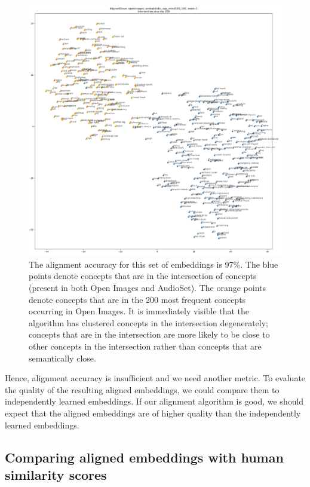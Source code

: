 \begin{figure}[H]
\label{fig:dysfunctional_clusters}
    \centering
    \includegraphics[width=1.0\textwidth]{images/method/probabilistic_aligned/dysfunctional_clusters.png}
    \caption{
        The alignment accuracy for this set of embeddings is 97\%. The blue points denote concepts that are in the intersection of concepts (present in both Open Images and AudioSet). The orange points denote concepts that are in the 200 most frequent concepts occurring in Open Images. It is immediately visible that the algorithm has clustered concepts in the intersection degenerately; concepts that are in the intersection are more likely to be close to other concepts in the intersection rather than concepts that are semantically close.
    }
\end{figure}

Hence, alignment accuracy is insufficient and we need another metric. To evaluate the quality of the resulting aligned embeddings, we could compare them to independently learned embeddings. If our alignment algorithm is good, we should expect that the aligned embeddings are of higher quality than the independently learned embeddings. 


\subsection{Comparing aligned embeddings with human similarity scores}


